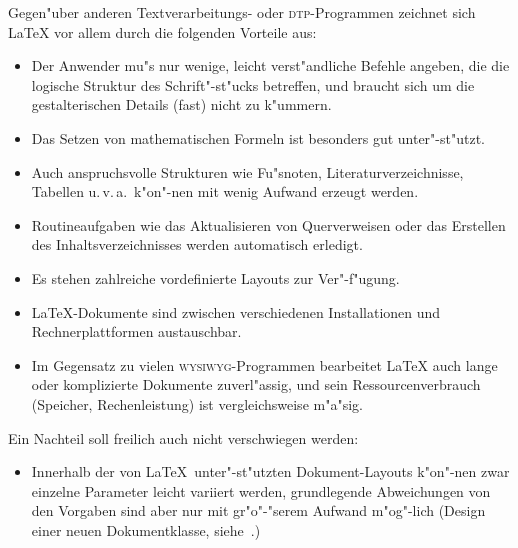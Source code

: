 Gegen"uber anderen Textverarbeitungs- oder \textsc{dtp}-Programmen 
zeichnet sich \LaTeX{}
vor allem durch die folgenden Vorteile aus:
\begin{itemize}
\item Der Anwender mu"s nur wenige, leicht verst"andliche Befehle
  angeben, die die logische Struktur des Schrift"-st"ucks
  betreffen, und braucht sich um die gestalterischen Details
  (fast) nicht zu k"ummern.
\item Das Setzen von mathematischen Formeln ist besonders gut
  unter"-st"utzt.
\item Auch anspruchsvolle Strukturen wie Fu"snoten, Literaturverzeichnisse,
  Tabellen u.\,v.\,a.\  k"on"-nen mit wenig Aufwand erzeugt werden.
\item Routineaufgaben wie das Aktualisieren von Querverweisen
 oder das Erstellen des Inhaltsverzeichnisses 
 werden automatisch erledigt.
\item Es stehen zahlreiche vordefinierte Layouts zur Ver"-f"ugung.
\item \LaTeX-Dokumente sind zwischen verschiedenen Installationen und
 Rechnerplattformen austauschbar.
\item Im Gegensatz zu vielen \textsc{wysiwyg}-Programmen bearbeitet \LaTeX{} auch
  lange oder komplizierte Dokumente zuverl"assig,
  und sein Ressourcenverbrauch (Speicher, Rechenleistung) ist vergleichsweise
  m"a"sig.
\end{itemize}
Ein Nachteil soll freilich auch nicht verschwiegen werden:
\begin{itemize}
\item Innerhalb der von \LaTeX\ unter"-st"utzten Dokument-Layouts
  k"on"-nen zwar einzelne Parameter leicht variiert werden,
  grundlegende Abweichungen von den Vorgaben sind
  aber nur mit gr"o"-"serem Aufwand m"og"-lich (Design einer
  neuen Dokumentklasse, siehe~\cite{clsguide,lay,lay2,typografie}.)
\end{itemize}


